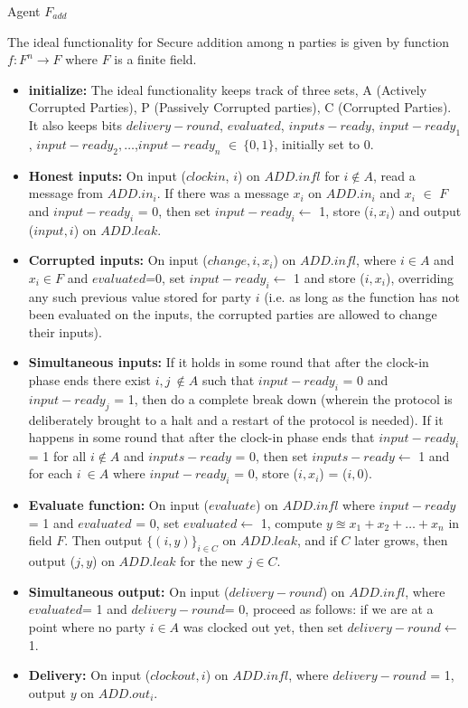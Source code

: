 \documentclass{llncs}
\begin{document}
\begin{framed}
\begin{center}
Agent $F_{add}$
\end{center} 
The ideal functionality for Secure addition among n parties is given by function $f: F^n \rightarrow F$ where $F$ is a finite field. 
\begin{itemize}
\item \textbf{initialize:} The ideal functionality keeps track of three sets, A 
(Actively Corrupted Parties), P (Passively Corrupted parties), C (Corrupted 
Parties). It also keeps bits $delivery-round$, $evaluated$, $inputs-ready$, $input-ready_1$, $input-ready_2,\dots$,$input-ready_n$ $ \in\ \{0,1\}$, 
initially set to 0.

\item \textbf{Honest inputs:} On input ($clockin$, $i$) on $ADD.infl$ for $i \notin A$, read a message from $ADD.in_i$. If there was a message $x_i$ on $ADD.in_i$ and $x_i$ $\in$ $F$ and $input-ready_i$ = 0, then set $input-ready_i\leftarrow$  1, store ($i, x_i$) and output ($input, i$) on $ADD.leak$.
\item \textbf{Corrupted inputs:} On input ($change, i, x_i$) on $ADD.infl$, where $i \in A$ and $x_i \in F$ and $evaluated$=0, set $input-ready_i \leftarrow$ 1 and store ($i, x_i$), overriding any such previous value stored for party $i$ (i.e. as long as the function has not been evaluated on the inputs, the corrupted parties are allowed to change their inputs).
\item \textbf{Simultaneous inputs:}  If it holds in some round that after the clock-in phase ends there exist $i,j\ \notin A$ such that $input-ready_i$ = 0 and $input-ready_j$ = 1, then do a complete break down (wherein the protocol is deliberately brought to a halt and a restart of the protocol is needed). If it happens in some round that after the clock-in phase ends that $input-ready_i$ = 1 for all $i \notin A$ and $inputs-ready$ = 0, then set $inputs-ready \leftarrow$ 1 and for each $i\ \in A$ where $input-ready_i$ = 0, store ($i,x_i$) = ($i,0$).
\item \textbf{Evaluate function:} On input ($evaluate$) on $ADD.infl$ where $input-ready$ = 1 and $evaluated$ = 0, set $evaluated \leftarrow$ 1, compute $y \approxeq x_1 + x_2 + \dots + x_n$ in field $F$. Then output 
$\{(i,y)\}_{i \in C}$ on $ADD.leak$, and if $C$ later grows, then output ($j,y$) on $ADD.leak$ for the new $j \in C$.
\item \textbf{Simultaneous output:} On input ($delivery-round$) on $ADD.infl$, where $evaluated$= 1 and $delivery-round$= 0, proceed as follows: if we are at a point where no party $i \in A$ was clocked out yet, then set $delivery-round\leftarrow$ 1.
\item \textbf{Delivery:} On input ($clockout, i$) on $ADD.infl$, where $delivery-round$ = 1, output $y$ on $ADD.out_i$.
\end{itemize}
\end{framed}
\end{document}

